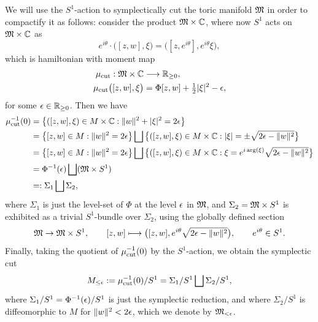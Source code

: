 We will use the $S^{1}$-action to symplectically cut the toric \HK manifold $\mathfrak{M}$ in order to compactify it as follows: consider the product $\mathfrak{M} \times \mathbb{C}$, where now $S^{1}$ acts on $\mathfrak{M} \times \mathbb{C}$ as
$$
e^{i\theta} \cdot \big( [z,w], \xi   \big) = \big( [z,e^{i\theta}], e^{i\theta}\xi\big),
$$
which is hamiltonian with moment map
\begin{equation*}
\begin{split}
\mu_{\text{cut}}: \mathfrak{M} \times \mathbb{C} &\longrightarrow \mathbb{R}_{\geq 0}, \\
\mu_{\text{cut}}\big( [z,w], \xi  \big) &= \Phi[z,w] + \tfrac{1}{2}|\xi|^{2} - \epsilon,
\end{split}
\end{equation*}
for some $\epsilon \in \mathbb{R}_{\geq 0}$. Then we have
\begin{equation*}
\begin{split}
\mu_{\text{cut}}^{-1}(0) &= \big\{ ([z,w],\xi) \in M \times \mathbb{C} : \|w\|^{2} + |\xi|^{2} = 2\epsilon    \big\} \\
&= \big\{ [z,w] \in M : \|w\|^{2} = 2\epsilon    \big\} \bigsqcup \big\{ ([z,w],\xi) \in M \times \mathbb{C} : |\xi| = \pm\sqrt{2\epsilon - \|w\|^{2}} \big\} \\
&= \big\{ [z,w] \in M : \|w\|^{2} = 2\epsilon    \big\} \bigsqcup \big\{ ([z,w],\xi) \in M \times \mathbb{C} : \xi = e^{i\arg(\xi)}\sqrt{2\epsilon - \|w\|^{2}}    \big\} \\
&= \Phi^{-1}(\epsilon) \bigsqcup (\mathfrak{M} \times S^{1}) \\
&=: \Sigma_{1} \bigsqcup \Sigma_{2},
\end{split}
\end{equation*}
where $\Sigma_{1}$ is just the level-set of $\Phi$ at the level $\epsilon$ in $\mathfrak{M}$, and $\Sigma_{2} = \mathfrak{M} \times S^{1}$ is exhibited as a trivial $S^{1}$-bundle over $\Sigma_{2}$, using the globally defined section
\begin{equation*}
	\mathfrak{M} \rightarrow \mathfrak{M} \times S^{1}, \qquad [z,w] \longmapsto \big( [z,w], e^{i\theta}\sqrt{2\epsilon - \|w\|^{2}}\big), \qquad e^{i\theta} \in S^{1}.
\end{equation*}
Finally, taking the quotient of $\mu_{\text{cut}}^{-1}(0)$ by the $S^{1}$-action, we obtain the symplectic cut
\begin{equation*}
	M_{\leq \epsilon} := \mu_{\text{cut}}^{-1}(0)/S^{1} = \Sigma_{1}/S^{1} \bigsqcup \Sigma_{2}/S^{1},
\end{equation*}
where $\Sigma_{1}/S^{1} = \Phi^{-1}(\epsilon)/S^{1}$ is just the symplectic reduction, and where $\Sigma_{2}/S^{1}$ is diffeomorphic to $M$ for $\|w\|^{2} < 2\epsilon$, which we denote by $\mathfrak{M}_{<\epsilon}$.

